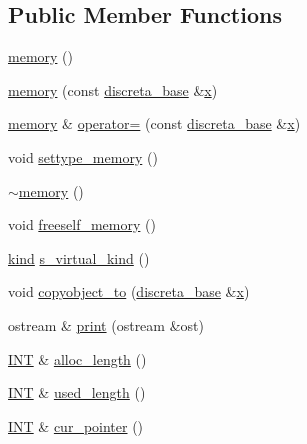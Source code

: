\subsection*{Public Member Functions}
\begin{DoxyCompactItemize}
\item 
\mbox{\hyperlink{classmemory_a05edf03af2b4a912939e00c7269e2085}{memory}} ()
\item 
\mbox{\hyperlink{classmemory_ade21bbe488443d2d3eb7b82a868298a6}{memory}} (const \mbox{\hyperlink{classdiscreta__base}{discreta\+\_\+base}} \&\mbox{\hyperlink{alphabet2_8_c_a6150e0515f7202e2fb518f7206ed97dc}{x}})
\item 
\mbox{\hyperlink{classmemory}{memory}} \& \mbox{\hyperlink{classmemory_a5550412426557d686fbf2df39e1dbb4c}{operator=}} (const \mbox{\hyperlink{classdiscreta__base}{discreta\+\_\+base}} \&\mbox{\hyperlink{alphabet2_8_c_a6150e0515f7202e2fb518f7206ed97dc}{x}})
\item 
void \mbox{\hyperlink{classmemory_a33aae277f9b8fe36b02e9d5da895451b}{settype\+\_\+memory}} ()
\item 
\mbox{\hyperlink{classmemory_ae5893b724ce22f38b776558384f21680}{$\sim$memory}} ()
\item 
void \mbox{\hyperlink{classmemory_a19366f9105d79a0e818cc19255d7ef4f}{freeself\+\_\+memory}} ()
\item 
\mbox{\hyperlink{discreta_8h_aaf25ee7e2306d78c74ec7bc48f092e81}{kind}} \mbox{\hyperlink{classmemory_a75dd039fc284723f284b9a62a199f623}{s\+\_\+virtual\+\_\+kind}} ()
\item 
void \mbox{\hyperlink{classmemory_a4fe4349915769808c6ff3cf83c661bf0}{copyobject\+\_\+to}} (\mbox{\hyperlink{classdiscreta__base}{discreta\+\_\+base}} \&\mbox{\hyperlink{alphabet2_8_c_a6150e0515f7202e2fb518f7206ed97dc}{x}})
\item 
ostream \& \mbox{\hyperlink{classmemory_a76e54475a51795259a3ebf1013a2559e}{print}} (ostream \&ost)
\item 
\mbox{\hyperlink{galois_8h_a09fddde158a3a20bd2dcadb609de11dc}{I\+NT}} \& \mbox{\hyperlink{classmemory_acaa1796a2f548d35cf87e03252b2184c}{alloc\+\_\+length}} ()
\item 
\mbox{\hyperlink{galois_8h_a09fddde158a3a20bd2dcadb609de11dc}{I\+NT}} \& \mbox{\hyperlink{classmemory_a3312a01b206cef29ec0f85ee340002dd}{used\+\_\+length}} ()
\item 
\mbox{\hyperlink{galois_8h_a09fddde158a3a20bd2dcadb609de11dc}{I\+NT}} \& \mbox{\hyperlink{classmemory_a24db8a00f6c8abfa6bb762264357cb22}{cur\+\_\+pointer}} ()

\end{DoxyCompactItemize}
